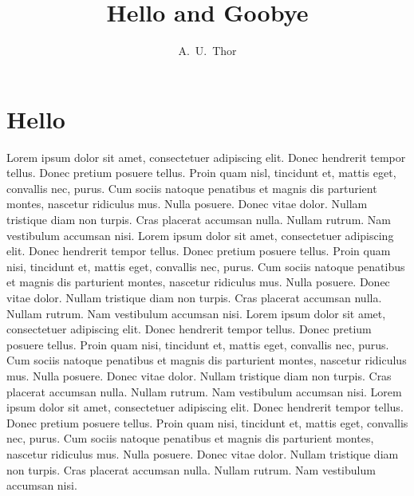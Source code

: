 \documentclass{book}
\title{Hello and Goobye}
\author{A.~U.~Thor}
\begin{document}
\maketitle

\chapter{Hello}

Lorem ipsum dolor sit amet, consectetuer adipiscing elit. Donec hendrerit tempor tellus. Donec pretium posuere tellus. Proin quam nisl, tincidunt et, mattis eget, convallis nec, purus. Cum sociis natoque penatibus et magnis dis parturient montes, nascetur ridiculus mus. Nulla posuere. Donec vitae dolor. Nullam tristique diam non turpis. Cras placerat accumsan nulla. Nullam rutrum. Nam vestibulum accumsan nisi.  Lorem ipsum dolor sit amet, consectetuer adipiscing elit. Donec hendrerit tempor tellus. Donec pretium posuere tellus. Proin quam nisi, tincidunt et, mattis eget, convallis nec, purus. Cum sociis natoque penatibus et magnis dis parturient montes, nascetur ridiculus mus. Nulla posuere. Donec vitae dolor. Nullam tristique diam non turpis. Cras placerat accumsan nulla. Nullam rutrum. Nam vestibulum accumsan nisi.  Lorem ipsum dolor sit amet, consectetuer adipiscing elit. Donec hendrerit tempor tellus. Donec pretium posuere tellus. Proin quam nisi, tincidunt et, mattis eget, convallis nec, purus. Cum sociis natoque penatibus et magnis dis parturient montes, nascetur ridiculus mus. Nulla posuere. Donec vitae dolor. Nullam tristique diam non turpis. Cras placerat accumsan nulla. Nullam rutrum. Nam vestibulum accumsan nisi.   Lorem ipsum dolor sit amet, consectetuer adipiscing elit. Donec hendrerit tempor tellus. Donec pretium posuere tellus. Proin quam nisi, tincidunt et, mattis eget, convallis nec, purus. Cum sociis natoque penatibus et magnis dis parturient montes, nascetur ridiculus mus. Nulla posuere. Donec vitae dolor. Nullam tristique diam non turpis. Cras placerat accumsan nulla. Nullam rutrum. Nam vestibulum accumsan nisi.
\end{document}
